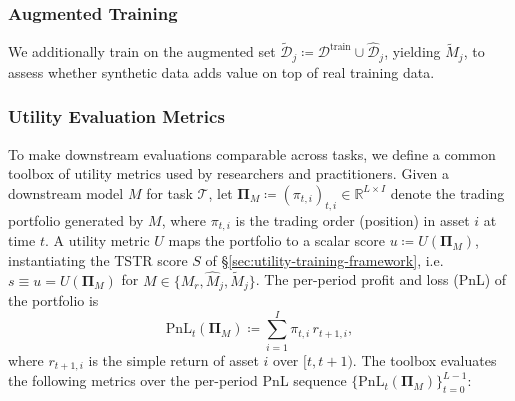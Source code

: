       \subsubsection{Augmented Training}
      \label{sec:augmented-training}
      We additionally train on the augmented set
      \(\tilde{\mathcal{D}}_j \coloneq \mathcal{D}^{\mathrm{train}} \cup
      \hat{\mathcal{D}}_j\), yielding \(\tilde{M}_j\), to assess whether
      synthetic data adds value on top of real training data.

    \subsubsection{Utility Evaluation Metrics}
    \label{sec:utility-evaluation}
      To make downstream evaluations comparable across tasks, we define a
      common toolbox of utility metrics used by researchers and
      practitioners. Given a downstream model \(M\) for task
      \(\mathcal{T}\), let \(\mathbf{\Pi}_M \coloneq (\pi_{t,i})_{t,i} \in
      \mathbb{R}^{L \times I}\) denote the trading portfolio generated by
      \(M\), where \(\pi_{t,i}\) is the trading order (position) in asset
      \(i\) at time \(t\). A utility metric \(U\) maps the portfolio to a
      scalar score \(u \coloneq U(\mathbf{\Pi}_M)\), instantiating the TSTR
      score \(S\) of §\ref{sec:utility-training-framework}, i.e.\
      \(s \equiv u = U(\mathbf{\Pi}_M)\) for
      \(M \in \{M_r, \hat{M}_j, \tilde{M}_j\}\). The per-period profit and
      loss (PnL) of the portfolio is
      \begin{equation}
        \mathrm{PnL}_t(\mathbf{\Pi}_M) \coloneq \sum_{i=1}^{I}
        \pi_{t,i}\, r_{t+1,i},
        \label{eq:utility-pnl}
      \end{equation}
      where \(r_{t+1,i}\) is the simple return of asset \(i\) over
      \([t, t+1)\). The toolbox evaluates the following metrics over the
      per-period PnL sequence
      \(\{\mathrm{PnL}_t(\mathbf{\Pi}_M)\}_{t=0}^{L-1}\):
